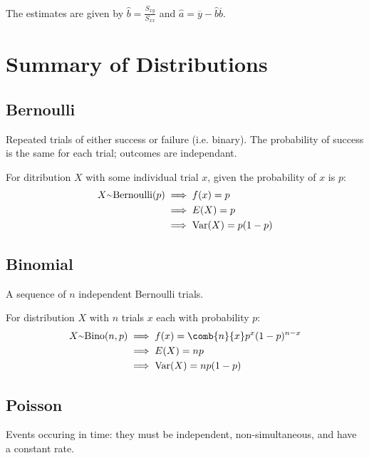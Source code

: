 \documentclass[12pt]{article}
\begin{document}
The estimates are given by $\hat{b} = \frac{S_{xy}}{S_{xx}}$ and $\hat{a} = \overline{y} - \hat{b}\overline{b}$.























\newpage

\section*{Summary of Distributions}
\subsection*{Bernoulli}
Repeated trials of either success or failure (i.e. binary). The probability of success is the same for each trial; outcomes are independant.

For ditribution $X$ with some individual trial $x$, given the probability of $x$ is $p$:
\begin{align*}
X \ttilde \text{Bernoulli}(p) &\implies f(x) = p\\
                              &\implies E(X) = p\\
                              &\implies \text{Var}(X) = p(1-p)
\end{align*}

\subsection*{Binomial}
A sequence of $n$ independent Bernoulli trials.

For distribution $X$ with $n$ trials $x$ each with probability $p$:
\begin{align*}
X \ttilde \text{Bino}(n, p)  &\implies f(x) = \comb{n}{x} p^x (1-p)^{n-x}\\
                             &\implies E(X) = np\\
                             &\implies \text{Var}(X) = np(1-p)
\end{align*}

\subsection*{Poisson}
Events occuring in time: they must be independent, non-simultaneous, and have a constant rate.
\end{document}
